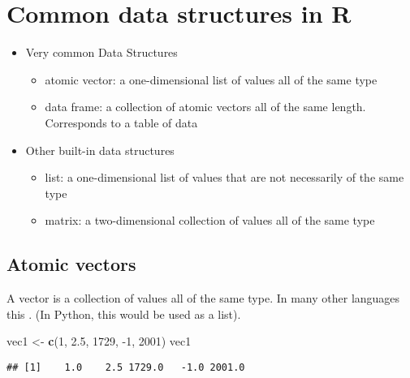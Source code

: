 \documentclass[]{book}
\newenvironment{Shaded}{\begin{snugshade}}{\end{snugshade}}
\newcommand{\DecValTok}[1]{\textcolor[rgb]{0.00,0.00,0.81}{#1}}
\newcommand{\FloatTok}[1]{\textcolor[rgb]{0.00,0.00,0.81}{#1}}
\newcommand{\KeywordTok}[1]{\textcolor[rgb]{0.13,0.29,0.53}{\textbf{#1}}}
\newcommand{\NormalTok}[1]{#1}
\newcommand{\StringTok}[1]{\textcolor[rgb]{0.31,0.60,0.02}{#1}}
\providecommand{\tightlist}{%
  \setlength{\itemsep}{0pt}\setlength{\parskip}{0pt}}
\begin{document}
\hypertarget{commondatastructures}{%
\section*{Common data structures in R}\label{commondatastructures}}

\begin{itemize}
\tightlist
\item
  Very common Data Structures

  \begin{itemize}
  \tightlist
  \item
    atomic vector: a one-dimensional list of values all of the same type
  \item
    data frame: a collection of atomic vectors all of the same length. Corresponds to a table of data
  \end{itemize}
\item
  Other built-in data structures

  \begin{itemize}
  \tightlist
  \item
    list: a one-dimensional list of values that are not necessarily of the same type
  \item
    matrix: a two-dimensional collection of values all of the same type
  \end{itemize}
\end{itemize}

\hypertarget{atomicvectors}{%
\subsection*{Atomic vectors}\label{atomicvectors}}

A vector is a collection of values all of the same type. In many other languages this . (In Python, this would be used as a list).

\begin{Shaded}
\begin{Highlighting}[]
\NormalTok{vec1 <-}\StringTok{ }\KeywordTok{c}\NormalTok{(}\DecValTok{1}\NormalTok{, }\FloatTok{2.5}\NormalTok{, }\DecValTok{1729}\NormalTok{, }\DecValTok{-1}\NormalTok{, }\DecValTok{2001}\NormalTok{)}
\NormalTok{vec1}
\end{Highlighting}
\end{Shaded}

\begin{verbatim}
## [1]    1.0    2.5 1729.0   -1.0 2001.0
\end{verbatim}
\end{document}
